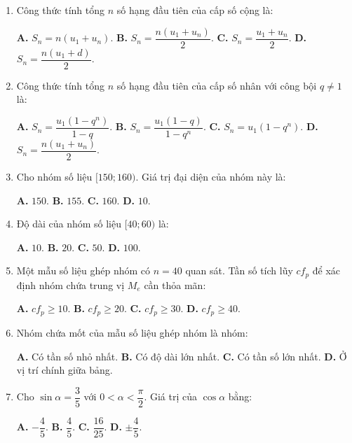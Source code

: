 \documentclass[12pt, a4paper]{article}
\begin{document}
\begin{enumerate}[leftmargin=1.5em]
    \item Công thức tính tổng $n$ số hạng đầu tiên của cấp số cộng là:
    \begin{center}
    \textbf{A.} $S_n = n(u_1 + u_n)$. \qquad \textbf{B.} $S_n = \dfrac{n(u_1 + u_n)}{2}$. \qquad \textbf{C.} $S_n = \dfrac{u_1 + u_n}{2}$. \qquad \textbf{D.} $S_n = \dfrac{n(u_1 + d)}{2}$.
    \end{center}

    \item Công thức tính tổng $n$ số hạng đầu tiên của cấp số nhân với công bội $q \neq 1$ là:
    \begin{center}
    \textbf{A.} $S_n = \dfrac{u_1(1 - q^n)}{1 - q}$. \qquad \textbf{B.} $S_n = \dfrac{u_1(1 - q)}{1 - q^n}$. \qquad \textbf{C.} $S_n = u_1(1 - q^n)$. \qquad \textbf{D.} $S_n = \dfrac{n(u_1 + u_n)}{2}$.
    \end{center}

    \item Cho nhóm số liệu $[150; 160)$. Giá trị đại diện của nhóm này là:
    \begin{center}
    \textbf{A.} $150$. \qquad \textbf{B.} $155$. \qquad \textbf{C.} $160$. \qquad \textbf{D.} $10$.
    \end{center}

    \item Độ dài của nhóm số liệu $[40; 60)$ là:
    \begin{center}
    \textbf{A.} $10$. \qquad \textbf{B.} $20$. \qquad \textbf{C.} $50$. \qquad \textbf{D.} $100$.
    \end{center}

    \item Một mẫu số liệu ghép nhóm có $n = 40$ quan sát. Tần số tích lũy $cf_p$ để xác định nhóm chứa trung vị $M_e$ cần thỏa mãn:
    \begin{center}
    \textbf{A.} $cf_p \ge 10$. \qquad \textbf{B.} $cf_p \ge 20$. \qquad \textbf{C.} $cf_p \ge 30$. \qquad \textbf{D.} $cf_p \ge 40$.
    \end{center}

    \item Nhóm chứa mốt của mẫu số liệu ghép nhóm là nhóm:
    \begin{center}
    \textbf{A.} Có tần số nhỏ nhất. \qquad \textbf{B.} Có độ dài lớn nhất. \qquad \textbf{C.} Có tần số lớn nhất. \qquad \textbf{D.} Ở vị trí chính giữa bảng.
    \end{center}

    \item Cho $\sin\alpha = \dfrac{3}{5}$ với $0 < \alpha < \dfrac{\pi}{2}$. Giá trị của $\cos\alpha$ bằng:
    \begin{center}
    \textbf{A.} $-\dfrac{4}{5}$. \qquad \textbf{B.} $\dfrac{4}{5}$. \qquad \textbf{C.} $\dfrac{16}{25}$. \qquad \textbf{D.} $\pm\dfrac{4}{5}$.
    \end{center}


\end{enumerate}
\end{document}
